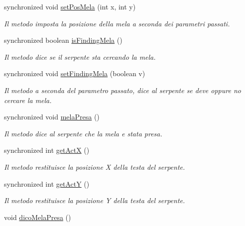 \begin{DoxyCompactItemize}
synchronized void \mbox{\hyperlink{class_snake_1_1game_1_1gioco_a6fcd26707b59561887560c3c4696062b}{set\+Pos\+Mela}} (int x, int y)
\begin{DoxyCompactList}\small\item\em Il metodo imposta la posizione della mela a seconda dei parametri passati. \end{DoxyCompactList}\item 
synchronized boolean \mbox{\hyperlink{class_snake_1_1game_1_1gioco_a627e7ff59c6e578230c0e1d99791cb57}{is\+Finding\+Mela}} ()
\begin{DoxyCompactList}\small\item\em Il metodo dice se il serpente sta cercando la mela. \end{DoxyCompactList}\item 
synchronized void \mbox{\hyperlink{class_snake_1_1game_1_1gioco_a4b25cde2a913ca9774e4db70bd5a584d}{set\+Finding\+Mela}} (boolean v)
\begin{DoxyCompactList}\small\item\em Il metodo a seconda del parametro passato, dice al serpente se deve oppure no cercare la mela. \end{DoxyCompactList}\item 
synchronized void \mbox{\hyperlink{class_snake_1_1game_1_1gioco_ab565cb1ea4ead20f825d28b7e78ec5c8}{mela\+Presa}} ()
\begin{DoxyCompactList}\small\item\em Il metodo dice al serpente che la mela e\textquotesingle{} stata presa. \end{DoxyCompactList}\item 
synchronized int \mbox{\hyperlink{class_snake_1_1game_1_1gioco_a0176af97fc1e2e7714a82049ab9a7069}{get\+ActX}} ()
\begin{DoxyCompactList}\small\item\em Il metodo restituisce la posizione X della testa del serpente. \end{DoxyCompactList}\item 
synchronized int \mbox{\hyperlink{class_snake_1_1game_1_1gioco_aedb81d58024c710a010bfa1c48f329f0}{get\+ActY}} ()
\begin{DoxyCompactList}\small\item\em Il metodo restituisce la posizione Y della testa del serpente. \end{DoxyCompactList}\item 
void \mbox{\hyperlink{class_snake_1_1game_1_1gioco_a5309846aa7b0465c29959c51b0182ced}{dico\+Mela\+Presa}} ()

\end{DoxyCompactItemize}
